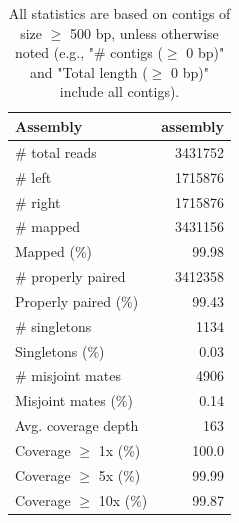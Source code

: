 \documentclass[12pt,a4paper]{article}
\begin{document}
\begin{table}[ht]
\begin{center}
\caption{All statistics are based on contigs of size $\geq$ 500 bp, unless otherwise noted (e.g., "\# contigs ($\geq$ 0 bp)" and "Total length ($\geq$ 0 bp)" include all contigs).}
\begin{tabular}{|l*{1}{|r}|}
\hline
Assembly & assembly \\ \hline
\# total reads & 3431752 \\ \hline
\# left & 1715876 \\ \hline
\# right & 1715876 \\ \hline
\# mapped & 3431156 \\ \hline
Mapped (\%) & 99.98 \\ \hline
\# properly paired & 3412358 \\ \hline
Properly paired (\%) & 99.43 \\ \hline
\# singletons & 1134 \\ \hline
Singletons (\%) & 0.03 \\ \hline
\# misjoint mates & 4906 \\ \hline
Misjoint mates (\%) & 0.14 \\ \hline
Avg. coverage depth & 163 \\ \hline
Coverage $\geq$ 1x (\%) & 100.0 \\ \hline
Coverage $\geq$ 5x (\%) & 99.99 \\ \hline
Coverage $\geq$ 10x (\%) & 99.87 \\ \hline
\end{tabular}
\end{center}
\end{table}
\end{document}

